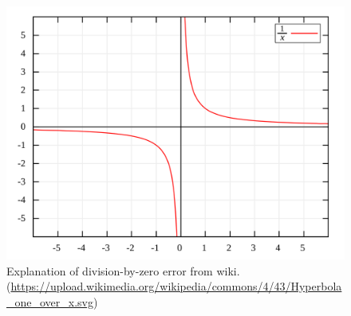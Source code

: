 \begin{figure}[!hb]
    \centering
    \includegraphics[trim={0 0 0 0.5cm},clip,scale=0.20]{sections/acm-template-sections/images/Hyperbola_one_over_x.svg.png}
    
    \caption{Explanation of division-by-zero error from wiki. (\url{https://upload.wikimedia.org/wikipedia/commons/4/43/Hyperbola_one_over_x.svg})}
    \label{fig:div-zero}
\end{figure}
